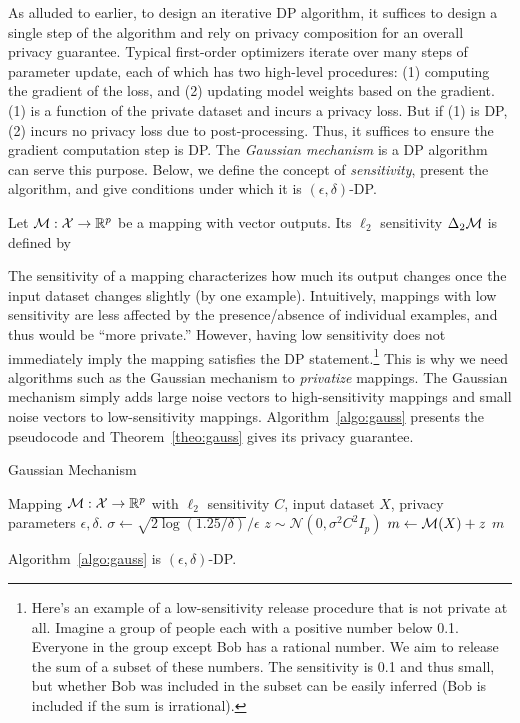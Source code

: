 As alluded to earlier, to design an iterative DP algorithm, it suffices to design a single step of the algorithm and rely on privacy composition for an overall privacy guarantee.
Typical first-order optimizers iterate over many steps of parameter update, each of which has two high-level procedures: (1) computing the gradient of the loss, and (2) updating model weights based on the gradient.
(1) is a function of the private dataset and incurs a privacy loss.
But if (1) is DP, (2) incurs no privacy loss due to post-processing.
Thus, it suffices to ensure the gradient computation step is DP.
The \emph{Gaussian mechanism} is a DP algorithm can serve this purpose.
Below, we define the concept of \emph{sensitivity}, present the algorithm, and give conditions under which it is $(\epsilon, \delta)$-DP.
\begin{defi}
Let $\mathcal{M}: \mathcal{X} \to \mathbb{R}^p$ be a mapping with vector outputs.
Its $\ell_2$ sensitivity $\Delta_2 \mathcal{M}$ is defined by
\end{defi}
The sensitivity of a mapping characterizes how much its output changes once the input dataset changes slightly (by one example).
Intuitively, mappings with low sensitivity are less affected by the presence/absence of individual examples, and thus would be ``more private.''
However, having low sensitivity does not immediately imply the mapping satisfies the DP statement.\footnote{Here's an example of a low-sensitivity release procedure that is not private at all. Imagine a group of people each with a positive number below 0.1. Everyone in the group except Bob has a rational number. We aim to release the sum of a subset of these numbers. The sensitivity is 0.1 and thus small, but whether Bob was included in the subset can be easily inferred (Bob is included if the sum is irrational).}
This is why we need algorithms such as the Gaussian mechanism to \emph{privatize} mappings.
The Gaussian mechanism simply adds large noise vectors to high-sensitivity mappings and small noise vectors to low-sensitivity mappings.
Algorithm~\ref{algo:gauss} presents the pseudocode and Theorem~\ref{theo:gauss} gives its privacy guarantee.
\begin{algorithm}[H]
\centering
\caption{Gaussian Mechanism}
\begin{algorithmic}[1]
    Mapping $\mathcal{M}: \mathcal{X} \to \mathbb{R}^p$ with $\ell_2$ sensitivity $C$, input dataset $X$, privacy parameters $\epsilon, \delta$.
  \State $\sigma \gets  \sqrt{2 \log(1.25 / \delta) } / \epsilon $
  \State $z \sim \mathcal{N}(0, \sigma^2 C^2 I_p)$
  \State $m \gets \mathcal{M}(X) + z$
  \State \Return $m$
\end{algorithmic}
\label{algo:gauss}
\end{algorithm}
\begin{theo}
\label{theo:gauss}
Algorithm~\ref{algo:gauss} is $(\epsilon, \delta)$-DP.
\end{theo}

